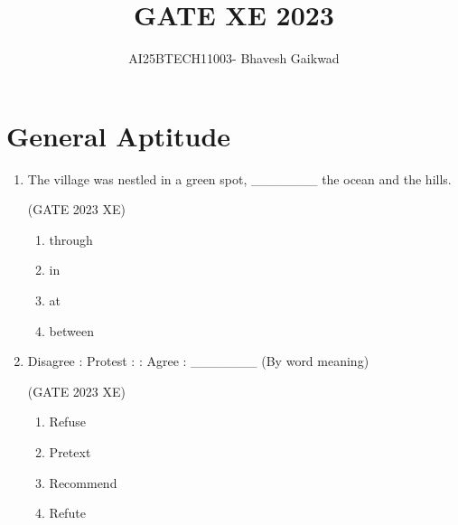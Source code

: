 \documentclass[journal,12pt,onecolumn]{IEEEtran}
\begin{document}
\title{GATE XE 2023}

\author{AI25BTECH11003- Bhavesh Gaikwad}

\maketitle


\section*{General Aptitude}

\bigskip

\begin{enumerate}

\item The village was nestled in a green spot, \_\_\_\_\_\_\_ the ocean and the hills.

\hfill{(GATE 2023 XE)}

\begin{multicols}{4}

\begin{enumerate}

\item through

\item in

\item at

\item between

\end{enumerate}

\end{multicols}

\item Disagree : Protest : : Agree : \_\_\_\_\_\_\_  
(By word meaning)

\hfill{(GATE 2023 XE)}

\begin{multicols}{4}

\begin{enumerate}

\item Refuse

\item Pretext

\item Recommend

\item Refute


\end{enumerate}
\end{multicols}
\end{enumerate}
\end{document}
